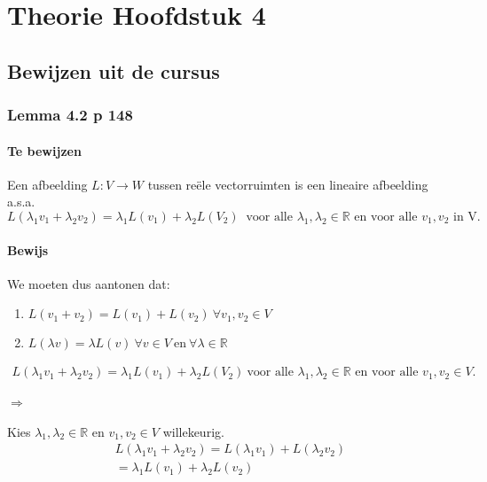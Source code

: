 \documentclass[lineaire_algebra_oplossingen.tex]{subfiles}
\begin{document}
\chapter{Theorie Hoofdstuk 4}

\section{Bewijzen uit de cursus}

\subsection{Lemma 4.2 p 148}
\label{4.2}

\subsubsection*{Te bewijzen}
Een afbeelding $L:V\rightarrow W$ tussen re\"ele vectorruimten is een lineaire afbeelding a.s.a.
$$L(\lambda_1v_1+\lambda_2v_2) = \lambda_1L(v_1)+\lambda_2L(V_2)\ \text{ voor alle } \lambda_1,\lambda_2 \in \mathbb{R} \text{ en voor alle } v_1,v_2 \text{ in V.}$$

\subsubsection*{Bewijs}
We moeten dus aantonen dat:
\begin{enumerate}
\item $L(v_1+v_2) = L(v_1) + L(v_2) \ \forall v_1,v_2 \in V$
\item $L(\lambda v) = \lambda L(v) \ \forall v \in V \ \text{en} \ \forall \lambda \in \mathbb{R}$
\end{enumerate}
\begin{align*}L(\lambda_1v_1+\lambda_2v_2) = \lambda_1L(v_1)+\lambda_2L(V_2)\ \text{voor alle $\lambda_1,\lambda_2 \in \mathbb{R}$ en voor alle $v_1,v_2 \in V$}. \tag{3.}
\end{align*}

\subsubsection*{$\Rightarrow$}
Kies $\lambda_1,\lambda_2 \in \mathbb{R}$ en $v_1,v_2 \in V$ willekeurig.
\begin{align*}
L(\lambda_1 v_1 + \lambda_2 v_2) = L(\lambda_1 v_1) + L(\lambda_2 v_2)\tag{wegens 1.}\\
=\lambda_1 L(v_1)+ \lambda_2 L(v_2) \tag{wegens 2.}
\end{align*}
\end{document}
